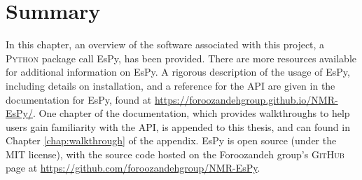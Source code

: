 \section{Summary}
In this chapter, an overview of the software associated with this project, a
\textsc{Python} package call \ac{EsPy}, has been provided.
There are more resources available for additional information on \ac{EsPy}. A rigorous
description of the usage of \ac{EsPy}, including details on installation, and a
reference for the \ac{API} are given in the documentation for \ac{EsPy}, found
at \url{https://foroozandehgroup.github.io/NMR-EsPy/}.
One chapter of the documentation, which provides walkthroughs to help users gain
familiarity with the \ac{API}, is appended to this thesis, and can found in
Chapter \ref{chap:walkthrough} of the appendix.
\ac{EsPy} is open source (under the \textsc{MIT} license), with the source code
hosted on the Foroozandeh group's \textsc{GitHub} page at
\url{https://github.com/foroozandehgroup/NMR-EsPy}.
